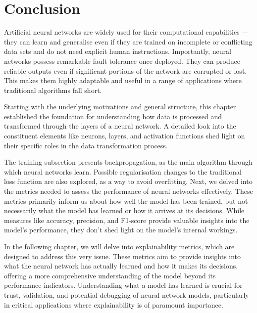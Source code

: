 \section{Conclusion}

Artificial neural networks are widely used for their computational capabilities --- they can learn and generalise even if they are trained on incomplete or conflicting data sets and do not need explicit human instructions. Importantly, neural networks possess remarkable fault tolerance once deployed. They can produce reliable outputs even if significant portions of the network are corrupted or lost. This makes them highly adaptable and useful in a range of applications where traditional algorithms fall short.

Starting with the underlying motivations and general structure, this chapter established the foundation for understanding how data is processed and transformed through the layers of a neural network. A detailed look into the constituent elements like neurons, layers, and activation functions shed light on their specific roles in the data transformation process.

The training subsection presents backpropagation, as the main algorithm through which neural networks learn. Possible regularisation changes to the traditional loss function are also explored, as a way to avoid overfitting. Next, we delved into the metrics needed to assess the performance of neural networks effectively. These metrics primarily inform us about how well the model has been trained, but not necessarily what the model has learned or how it arrives at its decisions. While measures like accuracy, precision, and F1-score provide valuable insights into the model's performance, they don't shed light on the model's internal workings.

In the following chapter, we will delve into explainability metrics, which are designed to address this very issue. These metrics aim to provide insights into what the neural network has actually learned and how it makes its decisions, offering a more comprehensive understanding of the model beyond its performance indicators. Understanding what a model has learned is crucial for trust, validation, and potential debugging of neural network models, particularly in critical applications where explainability is of paramount importance.
